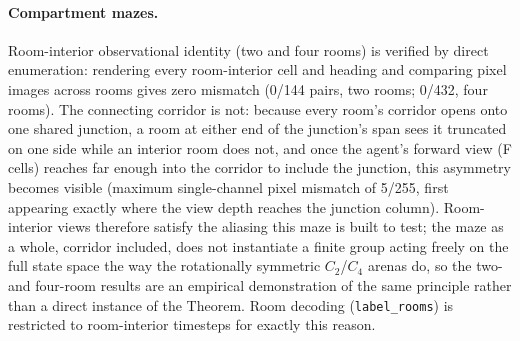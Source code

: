 \paragraph{Compartment mazes.} Room-interior observational identity (two and four rooms) is verified
by direct enumeration: rendering every room-interior cell and heading and comparing pixel images
across rooms gives zero mismatch (0/144 pairs, two rooms; 0/432, four rooms). The connecting corridor
is not: because every room's corridor opens onto one shared junction, a room at either end of the
junction's span sees it truncated on one side while an interior room does not, and once the agent's
forward view (F cells) reaches far enough into the corridor to include the junction, this asymmetry
becomes visible (maximum single-channel pixel mismatch of 5/255, first appearing exactly where the
view depth reaches the junction column). Room-interior views therefore satisfy the aliasing
this maze is built to test; the maze as a whole, corridor included, does not instantiate a finite
group acting freely on the full state space the way the rotationally symmetric $C_2$/$C_4$ arenas
do, so the two- and four-room results are an empirical demonstration of the same principle rather
than a direct instance of the Theorem. Room decoding (\texttt{label\_rooms}) is restricted to
room-interior timesteps for exactly this reason.

